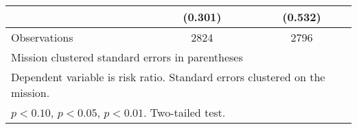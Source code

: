 \begin{table}[htbp]
\begin{tabular}{l*{2}{c}}
                    &     (0.301)        &     (0.532)        \\
\hline
Observations        &        2824        &        2796        \\
\hline\hline
\multicolumn{3}{l}{\fontsize{8}{8}\selectfont Mission clustered standard errors in parentheses}\\
\multicolumn{3}{l}{\fontsize{8}{8}\selectfont Dependent variable is risk ratio. Standard errors clustered on the mission.}\\
\multicolumn{3}{l}{\fontsize{8}{8}\selectfont \sym{\dagger} \(p<0.10\), \sym{*} \(p<0.05\), \sym{**} \(p<0.01\). Two-tailed test.}\\
\end{tabular}
\vspace{-2em}
\end{table}
